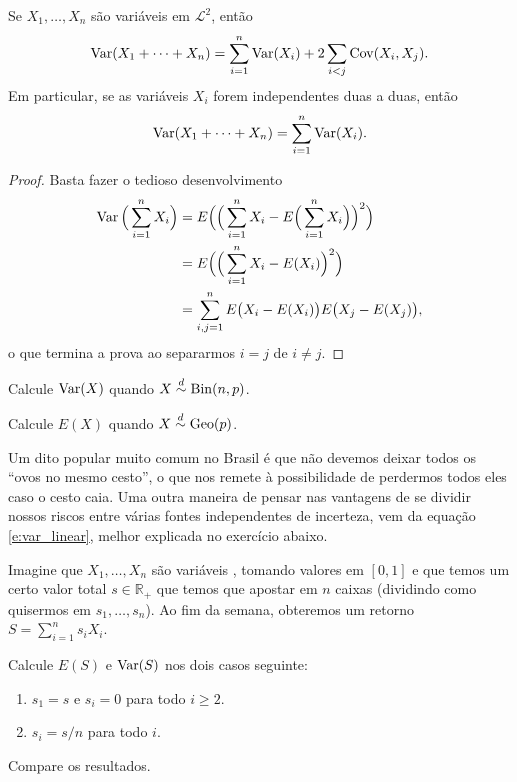 \begin{proposition}
  Se $X_1, \dots, X_n$ são variáveis em $\mathcal{L}^2$, então
  \begin{equation}
    \operatorname{Var}(X_1 + \dots + X_n)
    = \sum_{i=1}^n \operatorname{Var}(X_i) + 2\sum_{i < j} \operatorname{Cov}(X_i, X_j).
  \end{equation}
  Em particular, se as variáveis $X_i$ forem independentes duas a duas, então
  \begin{equation}
    \label{e:var_linear}
    \operatorname{Var}(X_1 + \dots + X_n) = \sum_{i=1}^n \operatorname{Var}(X_i).
  \end{equation}
\end{proposition}

\begin{proof}
  Basta fazer o tedioso desenvolvimento
  \begin{equation}
    \begin{split}
      \operatorname{Var}\Big( \sum_{i=1}^n X_i\Big)
      & = E \Big( \Big( \sum_{i=1}^n X_i
        - E\Big( \sum_{i=1}^n X_i\Big)\Big)^2\Big)\\
      & = E \Big( \Big( \sum_{i=1}^n X_i - E(X_i)\Big)^2\Big)\\
      & = \sum_{i, j = 1}^n E \big(X_i - E(X_i)\big)
        E\big(X_j - E(X_j)\big),
    \end{split}
  \end{equation}
  o que termina a prova ao separarmos $i = j$ de $i \neq j$.
\end{proof}

\begin{exercise}
  Calcule $\operatorname{Var}(X)$ quando $X \overset{d}\sim \operatorname{Bin}(n, p)$.
\end{exercise}

\begin{exercise}
  Calcule $E(X)$ quando $X \overset{d}\sim \operatorname{Geo}(p)$.
\end{exercise}

Um dito popular muito comum no Brasil é que não devemos deixar todos os ``ovos no mesmo cesto'', o que nos remete à possibilidade de perdermos todos eles caso o cesto caia.
Uma outra maneira de pensar nas vantagens de se dividir nossos riscos entre várias fontes independentes de incerteza, vem da equação \eqref{e:var_linear}, melhor explicada no exercício abaixo.

\begin{exercise}
  Imagine que $X_1, \dots, X_n$ são variáveis \iid, tomando valores em $[0,1]$ e que temos um certo valor total $s \in \mathbb{R}_+$ que temos que apostar em $n$ caixas (dividindo como quisermos em $s_1, \dots, s_n$).
  Ao fim da semana, obteremos um retorno $S = \sum_{i=1}^n s_i X_i$.

  Calcule $E(S)$ e $\operatorname{Var}(S)$ nos dois casos seguinte:
  \begin{enumerate}[\quad a)]
  \item $s_1 = s$ e $s_i = 0$ para todo $i \geq 2$.
  \item $s_i = s/n$ para todo $i$.
  \end{enumerate}
  Compare os resultados.
\end{exercise}

